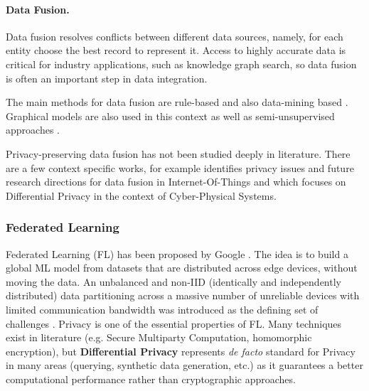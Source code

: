 \documentclass[12pt]{article}
\begin{document}
\paragraph{Data Fusion.} Data fusion resolves conflicts between different data sources, namely, for each entity choose the best record to represent it. 
Access to highly accurate data is critical for industry applications, such as knowledge graph search, so data fusion is often 
an important step in data integration.

The main methods for data fusion are rule-based \cite*{dong2009data} and also data-mining based \cite*{Pas2010}. 
Graphical models are also used in this context \cite*{Gao2016} as well as semi-unsupervised approaches \cite*{Reka2017}.

Privacy-preserving data fusion has not been studied deeply in literature. There are a few context specific works, for example \cite*{DING2019129} 
identifies privacy issues and future research directions for data fusion in Internet-Of-Things and \cite*{Gati2021} which focuses on Differential Privacy in the 
context of Cyber-Physical Systems.

\subsubsection{Federated Learning}
Federated Learning (FL) has been proposed by Google \cite*{Kon2016}. The idea is to build a global ML model from datasets that are 
distributed across edge devices, without moving the data. 
An unbalanced and non-IID (identically and independently distributed) data partitioning across a massive number of unreliable 
devices with limited communication bandwidth was introduced as the defining set of challenges \cite*{Kairouz2021}.
Privacy is one of the essential properties of FL. Many techniques exist in literature (e.g. Secure Multiparty Computation, homomorphic encryption), but 
\textbf{Differential Privacy} represents \textit{de facto} standard for Privacy in many areas (querying, synthetic data generation, etc.) as it guarantees a 
better computational performance rather than cryptographic approaches.
\end{document}
